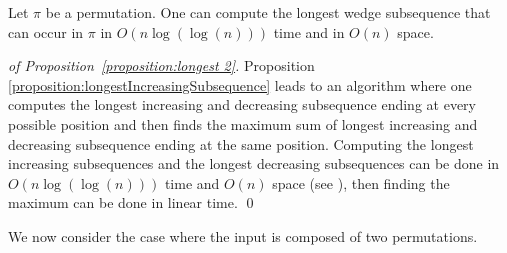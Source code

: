\documentclass[a4paper]{llncs}
\newcounter{num}
\begin{document}
%

\begin{proposition}
\label{proposition:longest 2}
Let $\pi$ be a permutation. One can compute
the longest wedge subsequence that can occur in $\pi$
in $O(n\log(\log(n)))$ time and in $O(n)$ space.
\end{proposition}

\begin{proof}[of Proposition~\ref{proposition:longest 2}]
Proposition \ref{proposition:longestIncreasingSubsequence} leads to an algorithm
where one computes the longest increasing and decreasing subsequence ending at every  possible position
and then finds the maximum sum of longest increasing and decreasing subsequence ending at the same position.
Computing the longest increasing subsequences and the longest decreasing subsequences can be done in
$O(n\log(\log(n)))$ time and $O(n)$ space
(see \cite{Bespamyatnikh00enumeratinglongest}),
then finding the maximum can be done in linear time.
\qed
\end{proof}

We  now consider the case where the input is composed of two permutations.
\end{document}
